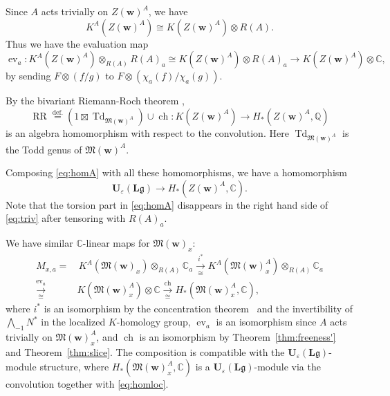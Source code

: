 \documentclass[12pt]{amsart}
\def\Bbb{\mathbb}
\def\frak{\mathfrak}
\theoremstyle{definition}
\theoremstyle{remark}
\numberwithin{equation}{subsection}
\newcommand{\thmref}[1]{Theorem~\ref{#1}}
\newcommand{\defeq}{\overset{\operatorname{\scriptstyle def.}}{=}}
\newcommand{\C}{{\Bbb C}}
\newcommand{\Q}{{\Bbb Q}}
\newcommand{\M}{{\frak M}} %
\newcommand{\bv}{{\mathbf v}} %
\newcommand{\bw}{{\mathbf w}} %
\newcommand{\Ule}{{\mathbf U}_{\varepsilon}({\mathbf L}\mathfrak g)}
\newcommand{\Wedge}{{\textstyle \bigwedge}}
\newcommand{\Zw}{Z(\bw)}
\newcommand{\Mw}{\M(\bw)}
\begin{document}
Since $A$ acts trivially on $\Zw^A$, we have
\begin{equation}\label{eq:triv}
   K^A(\Zw^A) \cong
   K(\Zw^A)\otimes R(A).
\end{equation}
Thus we have the evaluation map
\begin{equation*}
  \operatorname{ev}_a\colon 
  K^A(\Zw^A)\otimes_{R(A)} R(A)_a
   \cong 
  K(\Zw^A)\otimes R(A)_a
   \to
   K(\Zw^A)\otimes \C,
\end{equation*}
by sending $F\otimes (f/g)$ to $F\otimes (\chi_a(f)/\chi_a(g))$.

By the bivariant Riemann-Roch theorem \cite[5.11.11]{Gi-book},
\begin{equation*}
   \operatorname{RR} \defeq
   (1\boxtimes \operatorname{Td}_{\Mw^A})\cup
   \operatorname{ch}\colon 
   K(\Zw^A)\to H_*(\Zw^A,\Q)
\end{equation*}
is an algebra homomorphism with respect to the convolution. Here
$\operatorname{Td}_{\Mw^A}$ is the Todd genus
of $\Mw^A$.

Composing \eqref{eq:homA} with all these homomorphisms, we have a
homomorphism
\begin{equation}\label{eq:homloc}
   \Ule \to
   H_*(\Zw^A, \C).
\end{equation}
Note that the torsion part in \eqref{eq:homA}
disappears in the right hand side of \eqref{eq:triv} after tensoring
with $R(A)_a$.

We have similar $\C$-linear maps for $\Mw_x$:
\begin{equation}\label{eq:StdIsom}
\begin{split}
   M_{x,a} = & \,K^A(\Mw_x)\otimes_{R(A)}\C_a
   \xrightarrow[\cong]{i^*}
     K^A(\Mw_x^A)\otimes_{R(A)}\C_a \\
   \xrightarrow[\cong]{\operatorname{ev}_a}
   & K(\Mw_x^A)\otimes \C
   \xrightarrow[\cong]{\operatorname{ch}}
     H_*(\Mw_x^A,\C),
\end{split}
\end{equation}
where $i^*$ is an isomorphism by the concentration theorem~\cite{Thom}
and the invertibility of $\Wedge_{-1} N^*$ in the localized
$K$-homology group, $\operatorname{ev}_a$ is an isomorphism since $A$
acts trivially on $\Mw_x^A$, and $\operatorname{ch}$ is an isomorphism
by \thmref{thm:freeness'} and \thmref{thm:slice}.  The composition is
compatible with the $\Ule$-module structure, where $H_*(\Mw_x^A,\C)$
is a $\Ule$-module via the convolution together with
\eqref{eq:homloc}.
\end{document}
